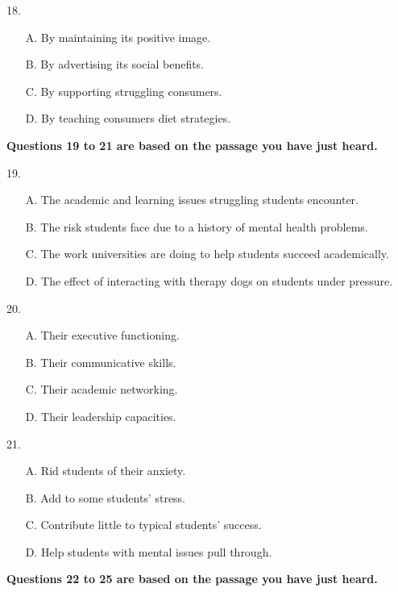 \documentclass[UTF8,11pt]{ctexart}
\begin{document}
18.


\begin{itemize}[leftmargin=2em,itemsep=.2em,topsep=.4em]\item[A.] By maintaining its positive image.
\item[B.] By advertising its social benefits.
\item[C.] By supporting struggling consumers.
\item[D.] By teaching consumers diet strategies.
\end{itemize}

\textbf{Questions 19 to 21 are based on the passage you have just heard.}


19.


\begin{itemize}[leftmargin=2em,itemsep=.2em,topsep=.4em]\item[A.] The academic and learning issues struggling students encounter.
\item[B.] The risk students face due to a history of mental health problems.
\item[C.] The work universities are doing to help students succeed academically.
\item[D.] The effect of interacting with therapy dogs on students under pressure.
\end{itemize}

20.


\begin{itemize}[leftmargin=2em,itemsep=.2em,topsep=.4em]\item[A.] Their executive functioning.
\item[B.] Their communicative skills.
\item[C.] Their academic networking.
\item[D.] Their leadership capacities.
\end{itemize}

21.


\begin{itemize}[leftmargin=2em,itemsep=.2em,topsep=.4em]\item[A.] Rid students of their anxiety.
\item[B.] Add to some students’ stress.
\item[C.] Contribute little to typical students’ success.
\item[D.] Help students with mental issues pull through.
\end{itemize}

\textbf{Questions 22 to 25 are based on the passage you have just heard.}
\end{document}
